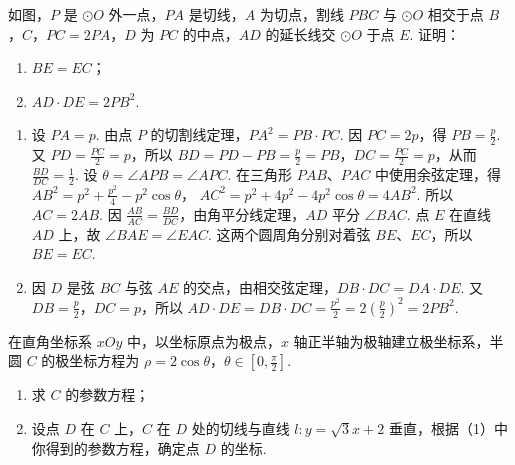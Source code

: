 \begin{problem}
如图，\(P\) 是 \(\odot O\) 外一点，\(PA\) 是切线，\(A\) 为切点，割线 \(PBC\) 与 \(\odot O\) 相交于点 \(B\)，\(C\)，\(PC=2PA\)，\(D\) 为 \(PC\) 的中点，\(AD\) 的延长线交 \(\odot O\) 于点 \(E\). 证明：
\begin{enumerate}
\item \(BE=EC\)；
\item \(AD\cdot DE=2PB^2\).
\end{enumerate}

\end{problem}

\begin{solution}
\begin{enumerate}
\item 设 \(PA=p\). 由点 \(P\) 的切割线定理，\(PA^2=PB\cdot PC\). 因 \(PC=2p\)，得 \(PB=\frac p2\). 又 \(PD=\frac{PC}{2}=p\)，所以 \(BD=PD-PB=\frac p2=PB\)，\(DC=\frac{PC}{2}=p\)，从而 \(\frac{BD}{DC}=\frac12\).
设 \(\theta=\angle APB=\angle APC\). 在三角形 \(PAB\)、\(PAC\) 中使用余弦定理，得
\(AB^2=p^2+\frac{p^2}{4}-p^2\cos\theta\)，
\(AC^2=p^2+4p^2-4p^2\cos\theta=4AB^2\).
所以 \(AC=2AB\). 因 \(\frac{AB}{AC}=\frac{BD}{DC}\)，由角平分线定理，\(AD\) 平分 \(\angle BAC\). 点 \(E\) 在直线 \(AD\) 上，故 \(\angle BAE=\angle EAC\). 这两个圆周角分别对着弦 \(BE\)、\(EC\)，所以 \(BE=EC\).
\item 因 \(D\) 是弦 \(BC\) 与弦 \(AE\) 的交点，由相交弦定理，\(DB\cdot DC=DA\cdot DE\). 又 \(DB=\frac p2\)，\(DC=p\)，所以
\(AD\cdot DE=DB\cdot DC=\frac{p^2}{2}=2\left(\frac p2\right)^2=2PB^2\).
\end{enumerate}
\end{solution}

\begin{problem}
在直角坐标系 \(xOy\) 中，以坐标原点为极点，\(x\) 轴正半轴为极轴建立极坐标系，半圆 \(C\) 的极坐标方程为 \(\rho=2\cos\theta\)，\(\theta\in\left[0,\frac{\pi}{2}\right]\).
\begin{enumerate}
\item 求 \(C\) 的参数方程；
\item 设点 \(D\) 在 \(C\) 上，\(C\) 在 \(D\) 处的切线与直线 \(l:y=\sqrt{3}x+2\) 垂直，根据（1）中你得到的参数方程，确定点 \(D\) 的坐标.
\end{enumerate}
\end{problem}

